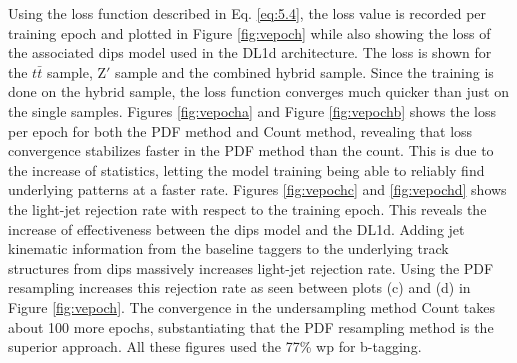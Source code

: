 Using the loss function described in Eq. \ref{eq:5.4}, the loss value is recorded per training epoch and plotted in Figure \ref{fig:vepoch} while 
also showing the loss of the associated \gls{dips} model used in the DL1d architecture. The loss is shown for the $t\bar{t}$ sample,
$\textrm{Z}'$ sample and the combined hybrid sample. Since the training is done on the hybrid sample, the loss function converges 
much quicker than just on the single samples. Figures \ref{fig:vepocha} and Figure \ref{fig:vepochb} shows the loss per epoch for both the PDF method and Count method, revealing 
that loss convergence stabilizes faster in the PDF method than the count. This is due to the increase of statistics, letting the model 
training being able to reliably find underlying patterns at a faster rate. Figures \ref{fig:vepochc} and \ref{fig:vepochd} shows the light-jet rejection rate with 
respect to the training epoch. This reveals the increase of effectiveness between the \gls{dips} model and the DL1d. Adding jet 
kinematic information from the baseline taggers to the underlying track structures from \gls{dips} massively increases light-jet 
rejection rate. Using the PDF resampling increases this rejection rate as seen between plots (c) and (d) in Figure \ref{fig:vepoch}. The convergence 
in the undersampling method Count takes about 100 more epochs, substantiating that the PDF resampling method is the superior approach. All 
these figures used the 77\% \gls{wp} for b-tagging. 


